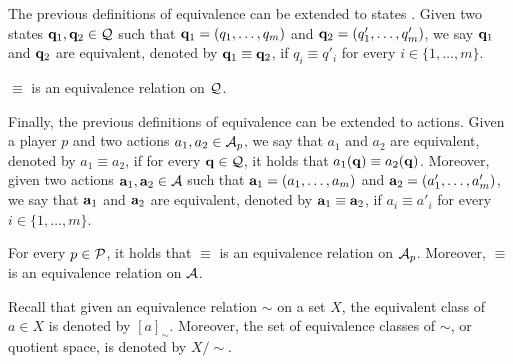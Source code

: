 
The previous definitions of equivalence can be extended to states . Given two states $\mathbf{q}_1, \mathbf{q}_2 \in \mathcal{Q}$ such that $\mathbf{q}_1 = (q_1, \ldots, q_m)$ and $\mathbf{q}_2 = (q'_1, \ldots, q'_m)$, we say $\mathbf{q}_1$ and $\mathbf{q}_2$ are equivalent, denoted by $\mathbf{q}_1 \equiv \mathbf{q}_2$, if $q_i \equiv q'_i$ for every $i \in \{1, \ldots, m\}$. 

\begin{mylem}
$\equiv$ is an equivalence relation on $\mathcal{Q}$.
\end{mylem}


Finally, the previous definitions of equivalence can be extended to actions.
Given a player $p$ and two actions $a_1, a_2 \in \mathcal{A}_p$, we say that $a_1$ and $a_2$ are equivalent, denoted by $a_1 \equiv a_2$, if for every $\mathbf{q} \in \mathcal{Q}$, it holds that $a_1(\mathbf{q}) \equiv a_2(\mathbf{q})$. Moreover, given two actions $\mathbf{a}_1, \mathbf{a}_2 \in \mathcal{A}$ such that $\mathbf{a}_1 = (a_1, \ldots, a_m)$ and $\mathbf{a}_2 = (a'_1, \ldots, a'_m)$, we say that $\mathbf{a}_1$ and $\mathbf{a}_2$ are equivalent, denoted by $\mathbf{a}_1 \equiv \mathbf{a}_2$, if $a_i \equiv a'_i$ for every $i \in \{1, \ldots, m\}$.
\begin{mylem}
For every $p \in \mathcal{P}$, it holds that $\equiv$ is an equivalence relation on $\mathcal{A}_p$. Moreover, $\equiv$ is an equivalence relation on $\mathcal{A}$. 
\end{mylem}




Recall that given an equivalence relation $\sim$ on a set $X$, the equivalent class of $a \in X$ is denoted by $[a]_\sim$. Moreover, the set of equivalence classes of $\sim$, or quotient space, is denoted by $X/\!\!\sim$. 

